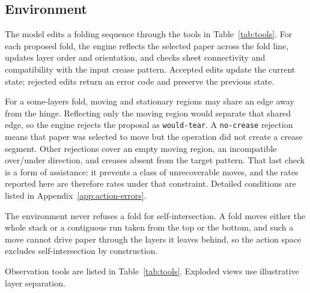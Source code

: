\subsection{Environment}
\label{sec:env}
\label{sec:env-one-object}
\label{sec:env-division}

The model edits a folding sequence through the tools in Table~\ref{tab:tools}. For each proposed
fold, the engine reflects the selected paper across the fold line, updates layer order and
orientation, and checks sheet connectivity and compatibility with the input crease pattern.
Accepted edits update the current state; rejected edits return an error code and preserve the
previous state.

\label{sec:env-refusals}
For a some-layers fold, moving and stationary regions may share an edge away from the hinge.
Reflecting only the moving region would separate that shared edge, so the engine rejects the
proposal as \texttt{would-tear}. A \texttt{no-crease} rejection means that paper was selected to
move but the operation did not create a crease segment. Other rejections cover an empty moving region, an incompatible over/under direction,
and creases absent from the target pattern. That last check is a form of assistance: it prevents a
class of unrecoverable moves, and the rates reported here are therefore rates under that
constraint. Detailed conditions are listed in
Appendix~\ref{app:action-errors}.

The environment never refuses a fold for self-intersection. A fold moves either the whole stack or
a contiguous run taken from the top or the bottom, and such a move cannot drive paper through the
layers it leaves behind, so the action space excludes self-intersection by construction.

\label{sec:env-observes}
Observation tools are listed in Table~\ref{tab:tools}. Exploded views use illustrative
layer separation.
